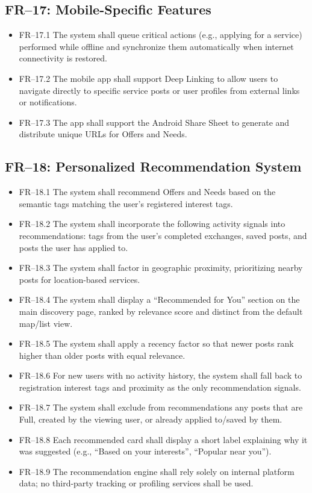 \documentclass[11pt,a4paper]{report}
\begin{document}
\subsection{FR--17: Mobile-Specific Features}
\begin{itemize}
    \item FR--17.1 The system shall queue critical actions (e.g., applying for a service) performed while offline and synchronize them automatically when internet connectivity is restored.
    \item FR--17.2 The mobile app shall support Deep Linking to allow users to navigate directly to specific service posts or user profiles from external links or notifications.
    \item FR--17.3 The app shall support the Android Share Sheet to generate and distribute unique URLs for Offers and Needs.
\end{itemize}

\subsection{FR--18: Personalized Recommendation System}
\begin{itemize}
    \item FR--18.1 The system shall recommend Offers and Needs based on the semantic tags matching the user's registered interest tags.
    \item FR--18.2 The system shall incorporate the following activity signals into recommendations: tags from the user's completed exchanges, saved posts, and posts the user has applied to.
    \item FR--18.3 The system shall factor in geographic proximity, prioritizing nearby posts for location-based services.
    \item FR--18.4 The system shall display a ``Recommended for You'' section on the main discovery page, ranked by relevance score and distinct from the default map/list view.
    \item FR--18.5 The system shall apply a recency factor so that newer posts rank higher than older posts with equal relevance.
    \item FR--18.6 For new users with no activity history, the system shall fall back to registration interest tags and proximity as the only recommendation signals.
    \item FR--18.7 The system shall exclude from recommendations any posts that are Full, created by the viewing user, or already applied to/saved by them.
    \item FR--18.8 Each recommended card shall display a short label explaining why it was suggested (e.g., ``Based on your interests'', ``Popular near you'').
    \item FR--18.9 The recommendation engine shall rely solely on internal platform data; no third-party tracking or profiling services shall be used.
\end{itemize}
\end{document}
